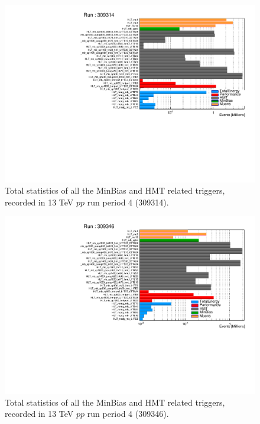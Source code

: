 \begin{figure}[H]
\centering
\includegraphics[width=.9\linewidth]{figs/sec_evtSlc/stat_pp13_run4_1.pdf}
\caption{Total statistics of all the MinBias and HMT related triggers, recorded in 13 TeV $pp$ run period 4 (309314).}
\label{fig:stat_pp13_run4}
\end{figure}

\begin{figure}[H]
\centering
\includegraphics[width=.9\linewidth]{figs/sec_evtSlc/stat_pp13_run4_2.pdf}
\caption{Total statistics of all the MinBias and HMT related triggers, recorded in 13 TeV $pp$ run period 4 (309346).}
\label{fig:stat_pp13_run4}
\end{figure}

